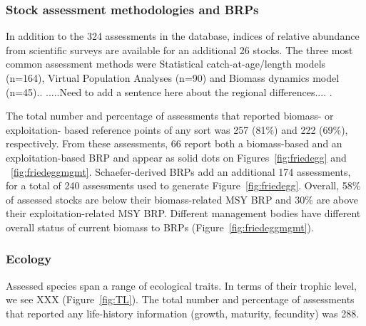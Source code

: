 \subsubsection*{Stock assessment methodologies and BRPs}
In addition to the 324 assessments in the
database, indices of relative abundance from scientific surveys are
available for an additional 26 stocks. The
three most common assessment methods were Statistical catch-at-age/length models (n=164),
Virtual Population Analyses (n=90) and Biomass dynamics model (n=45)..  .....Need
to add a sentence here about the regional differences.... .


The total number and percentage of assessments that reported biomass-
or exploitation- based reference points of any sort was
257 (81\%) and
222 (69\%),
respectively. From these assessments,
66 report both a biomass-based and an
exploitation-based BRP and appear as solid dots on
Figures~\ref{fig:friedegg} and ~\ref{fig:friedeggmgmt}. Schaefer-derived BRPs
add an additional 174 assessments, for
a total of 240 assessments used to generate
Figure~\ref{fig:friedegg}. Overall,
58\% of assessed stocks are below
their biomass-related MSY BRP and
30\% are above their
exploitation-related MSY BRP. Different management bodies have
different overall status of current biomass to BRPs
(Figure~\ref{fig:friedeggmgmt}).
 
\subsubsection*{Ecology}
Assessed species span a range of ecological traits. In terms of their
trophic level, we see XXX (Figure~\ref{fig:TL}). The total number and
percentage of assessments that reported any life-history information
(growth, maturity, fecundity) was 288.




